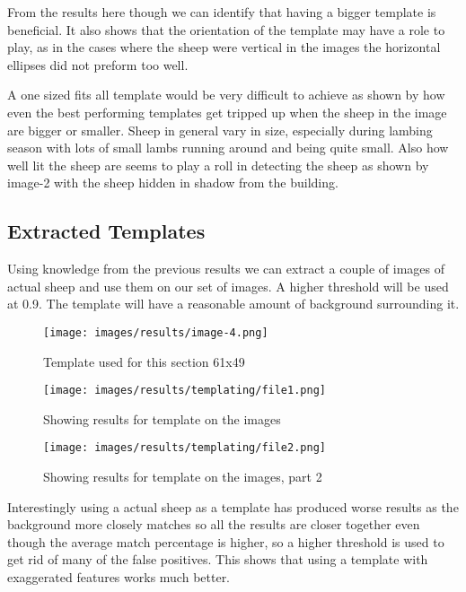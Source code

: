 From the results here though we can identify that having a bigger template is beneficial. It also shows that the orientation of the template may have a role to play, as in the cases where the sheep were vertical in the images the horizontal ellipses did not preform too well.

A one sized fits all template would be very difficult to achieve as shown by how even the best performing templates get tripped up when the sheep in the image are bigger or smaller. Sheep in general vary in size, especially during lambing season with lots of small lambs running around and being quite small. Also how well lit the sheep are seems to play a roll in detecting the sheep as shown by image-2 with the sheep hidden in shadow from the building.

\subsection{Extracted Templates}

Using knowledge from the previous results we can extract a couple of images of actual sheep and use them on our set of images. A higher threshold will be used at 0.9. The template will have a reasonable amount of background surrounding it.

\begin{figure}[H]
    \centering
    \texttt{[image: images/results/image-4.png]}
    \caption{Template used for this section 61x49}
    \label{fig:template}
\end{figure}

\begin{figure}[H]
    \centering
    \texttt{[image: images/results/templating/file1.png]}
    \caption{Showing results for template on the images}
    \label{fig:Templating-Results-for-template}
\end{figure}
\begin{figure}[H]
    \centering
    \texttt{[image: images/results/templating/file2.png]}
    \caption{Showing results for template on the images, part 2}
    \label{fig:Templating-Results-for-template1}
\end{figure}

Interestingly using a actual sheep as a template has produced worse results as the background more closely matches so all the results are closer together even though the average match percentage is higher, so a higher threshold is used to get rid of many of the false positives. This shows that using a template with exaggerated features works much better.

